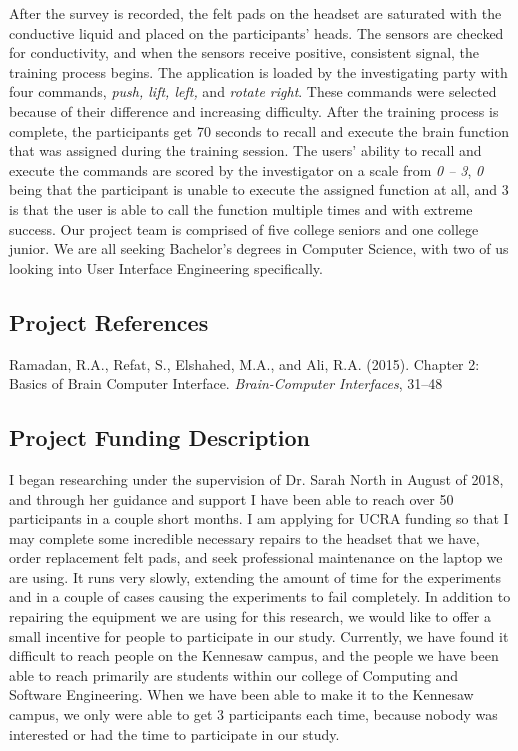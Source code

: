 \documentclass{article}
\begin{document}
After the survey is recorded, the felt pads on the headset are saturated with the conductive liquid and placed on the participants' heads. The sensors are checked for conductivity, and when the sensors receive positive, consistent signal, the training process begins. 
\newline \newline
The application is loaded by the investigating party with four commands, \textit{push, lift, left,} and \textit{rotate right}. These commands were selected because of their difference and increasing difficulty. After the training process is complete, the participants get 70 seconds to recall and execute the brain function that was assigned during the training session. 
\newline \newline
The users' ability to recall and execute the commands are scored by the investigator on a scale from \textit{0 -- 3}, \textit{0} being that the participant is unable to execute the assigned function at all, and 3 is that the user is able to call the function multiple times and with extreme success.  
\newline\newline 
Our project team is comprised of five college seniors and one college junior. We are all seeking Bachelor's degrees in Computer Science, with two of us looking into User Interface Engineering specifically.

\subsection*{Project References}
Ramadan, R.A., Refat, S., Elshahed, M.A., and Ali, R.A. (2015). Chapter 2: Basics of Brain Computer Interface. \textit{Brain-Computer Interfaces}, 31--48

\subsection*{Project Funding Description}
I began researching under the supervision of Dr. Sarah North in August of 2018, and through her guidance and support I have been able to reach over 50 participants in a couple short months. 
\newline \newline
I am applying for UCRA funding so that I may complete some incredible necessary repairs to the headset that we have, order replacement felt pads, and seek professional maintenance on the laptop we are using. It runs very slowly, extending the amount of time for the experiments and in a couple of cases causing the experiments to fail completely. 
\newline \newline
In addition to repairing the equipment we are using for this research, we would like to offer a small incentive for people to participate in our study. Currently, we have found it difficult to reach people on the Kennesaw campus, and the people we have been able to reach primarily are students within our college of Computing and Software Engineering. When we have been able to make it to the Kennesaw campus, we only were able to get 3 participants each time, because nobody was interested or had the time to participate in our study.
\end{document}

